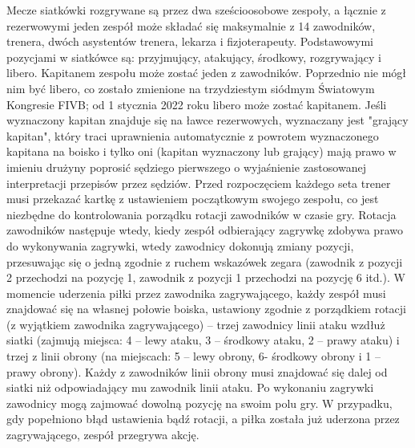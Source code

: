 \documentclass[14pt,oneside,a4paper]{book}
\theoremstyle{break}
\begin{document}
Mecze siatkówki rozgrywane są przez dwa sześcioosobowe zespoły, a łącznie z rezerwowymi jeden zespół może składać się maksymalnie z 14 zawodników, trenera, dwóch asystentów trenera, lekarza i fizjoterapeuty. Podstawowymi pozycjami w siatkówce są: przyjmujący, atakujący, środkowy, rozgrywający i libero. Kapitanem zespołu może zostać jeden z zawodników. Poprzednio nie mógł nim być libero, co zostało zmienione na trzydziestym siódmym Światowym Kongresie FIVB; od 1 stycznia 2022 roku libero może zostać kapitanem. Jeśli wyznaczony kapitan znajduje się na ławce rezerwowych, wyznaczany jest "grający kapitan", który traci uprawnienia automatycznie z powrotem wyznaczonego kapitana na boisko i tylko oni (kapitan wyznaczony lub grający) mają prawo w imieniu drużyny poprosić sędziego pierwszego o wyjaśnienie zastosowanej interpretacji przepisów przez sędziów.
Przed rozpoczęciem każdego seta trener musi przekazać kartkę z ustawieniem początkowym swojego zespołu, co jest niezbędne do kontrolowania porządku rotacji zawodników w czasie gry. Rotacja zawodników następuje wtedy, kiedy zespół odbierający zagrywkę zdobywa prawo do wykonywania zagrywki, wtedy zawodnicy dokonują zmiany pozycji, przesuwając się o jedną zgodnie z ruchem wskazówek zegara (zawodnik z pozycji 2 przechodzi na pozycję 1, zawodnik z pozycji 1 przechodzi na pozycję 6 itd.).
W momencie uderzenia piłki przez zawodnika zagrywającego, każdy zespół musi znajdować się na własnej połowie boiska, ustawiony zgodnie z porządkiem rotacji (z wyjątkiem zawodnika zagrywającego) – trzej zawodnicy linii ataku wzdłuż siatki (zajmują miejsca: 4 – lewy ataku, 3 – środkowy ataku, 2 – prawy ataku) i trzej z linii obrony (na miejscach: 5 – lewy obrony, 6- środkowy obrony i 1 – prawy obrony). Każdy z zawodników linii obrony musi znajdować się dalej od siatki niż odpowiadający mu zawodnik linii ataku. Po wykonaniu zagrywki zawodnicy mogą zajmować dowolną pozycję na swoim polu gry. W przypadku, gdy popełniono błąd ustawienia bądź rotacji, a piłka została już uderzona przez zagrywającego, zespół przegrywa akcję.

\par\vspace{1cm}\par
\begin{flushright}

\end{flushright}
\end{document}
